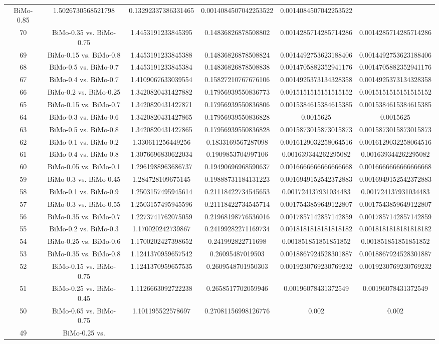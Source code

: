 \documentclass[a4paper,10pt]{article}
\begin{document}
\begin{landscape}
\begin{table}[!htp]
\begin{tabular}{cccccc}
BiMo-0.85&1.5026730568521798&0.13292337386331465&0.0014084507042253522&0.0014084507042253522\\70&BiMo-0.35 vs. BiMo-0.75&1.4453191233845395&0.14836826878508802&0.0014285714285714286&0.0014285714285714286\\69&BiMo-0.15 vs. BiMo-0.8&1.4453191233845388&0.14836826878508824&0.0014492753623188406&0.0014492753623188406\\68&BiMo-0.5 vs. BiMo-0.7&1.4453191233845384&0.14836826878508838&0.0014705882352941176&0.0014705882352941176\\67&BiMo-0.4 vs. BiMo-0.7&1.4109067633039554&0.15827210767676106&0.0014925373134328358&0.0014925373134328358\\66&BiMo-0.2 vs. BiMo-0.25&1.3420820431427882&0.17956939550836773&0.0015151515151515152&0.0015151515151515152\\65&BiMo-0.15 vs. BiMo-0.7&1.3420820431427871&0.17956939550836806&0.0015384615384615385&0.0015384615384615385\\64&BiMo-0.3 vs. BiMo-0.6&1.3420820431427865&0.17956939550836828&0.0015625&0.0015625\\63&BiMo-0.5 vs. BiMo-0.8&1.3420820431427865&0.17956939550836828&0.0015873015873015873&0.0015873015873015873\\62&BiMo-0.1 vs. BiMo-0.2&1.330611256449256&0.1833169567287098&0.0016129032258064516&0.0016129032258064516\\61&BiMo-0.4 vs. BiMo-0.8&1.3076696830622034&0.1909853704997106&0.001639344262295082&0.001639344262295082\\60&BiMo-0.05 vs. BiMo-0.1&1.2961988963686737&0.19490696968590637&0.0016666666666666668&0.0016666666666666668\\59&BiMo-0.3 vs. BiMo-0.45&1.284728109675145&0.19888731184131223&0.0016949152542372883&0.0016949152542372883\\58&BiMo-0.1 vs. BiMo-0.9&1.2503157495945614&0.21118422734545653&0.001724137931034483&0.001724137931034483\\57&BiMo-0.3 vs. BiMo-0.55&1.2503157495945596&0.21118422734545714&0.0017543859649122807&0.0017543859649122807\\56&BiMo-0.35 vs. BiMo-0.7&1.2273741762075059&0.21968198776536016&0.0017857142857142859&0.0017857142857142859\\55&BiMo-0.2 vs. BiMo-0.3&1.170020242739867&0.24199282271169734&0.0018181818181818182&0.0018181818181818182\\54&BiMo-0.25 vs. BiMo-0.6&1.1700202427398652&0.241992822711698&0.001851851851851852&0.001851851851851852\\53&BiMo-0.35 vs. BiMo-0.8&1.1241370959657542&0.26095487019503&0.0018867924528301887&0.0018867924528301887\\52&BiMo-0.15 vs. BiMo-0.75&1.1241370959657535&0.2609548701950303&0.0019230769230769232&0.0019230769230769232\\51&BiMo-0.25 vs. BiMo-0.45&1.1126663092722238&0.2658517702059946&0.00196078431372549&0.00196078431372549\\50&BiMo-0.65 vs. BiMo-0.75&1.101195522578697&0.27081156998126776&0.002&0.002\\49&BiMo-0.25 vs. 
\end{tabular}
\end{table}
\end{landscape}
\end{document}
